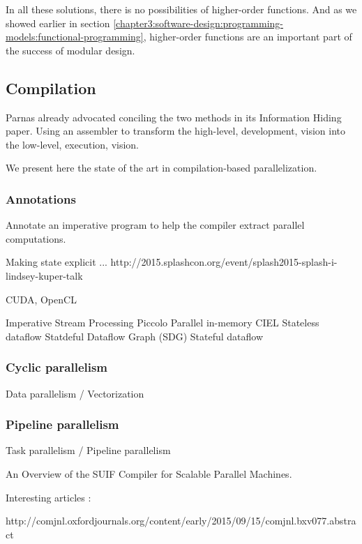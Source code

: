 In all these solutions, there is no possibilities of higher-order functions.
And as we showed earlier in section \ref{chapter3:software-design:programming-models:functional-programming}, higher-order functions are an important part of the success of modular design.

\subsection{Compilation}

Parnas already advocated conciling the two methods in its Information Hiding paper.
Using an assembler to transform the high-level, development, vision into the low-level, execution, vision.

We present here the state of the art in compilation-based parallelization.

\subsubsection{Annotations}

Annotate an imperative program to help the compiler extract parallel computations.

Making state explicit ... \cite{Fernandez2014a}
http://2015.splashcon.org/event/splash2015-splash-i-lindsey-kuper-talk

CUDA, OpenCL

Imperative Stream Processing
  Piccolo                                  Parallel in-memory \cite{Power2010}
  CIEL                                    Stateless dataflow \cite{Murray2011}
  Statdeful Dataflow Graph (SDG)          Stateful dataflow  \cite{Fernandez2014a}

\subsubsection{Cyclic parallelism}
Data parallelism / Vectorization

\subsubsection{Pipeline parallelism}
Task parallelism / Pipeline parallelism


An Overview of the SUIF Compiler for Scalable Parallel Machines. \cite{Amarasinghe1995}


Interesting articles :

http://comjnl.oxfordjournals.org/content/early/2015/09/15/comjnl.bxv077.abstract


